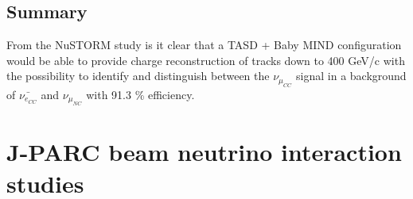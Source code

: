 


\pagebreak
\newpage

\section{Summary}
From the NuSTORM study is it clear that a TASD + Baby MIND configuration would be able to provide charge reconstruction of tracks down to 400 GeV/c with the possibility to identify and distinguish between the $\nu_{\mu_{CC}}$ signal in a background of $\bar{\nu_{e_{CC}}}$ and $\nu_{\mu_{NC}}$ with 91.3 \% efficiency.


\pagebreak
\newpage
\chapter{J-PARC beam neutrino interaction studies}
\label{c:neutrinoT2K}





